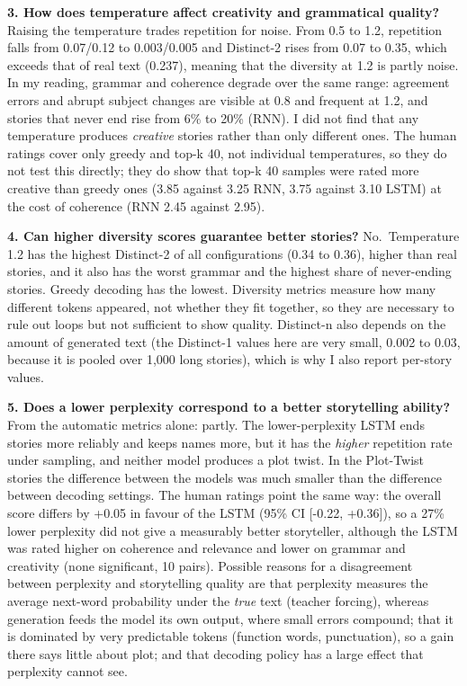 \documentclass[10pt,a4paper]{article}
\begin{document}
\textbf{3. How does temperature affect creativity and grammatical quality?} Raising the temperature trades repetition for noise. From 0.5 to 1.2,
repetition falls from 0.07/0.12 to 0.003/0.005 and Distinct-2 rises from 0.07 to 0.35, which exceeds that of real text (0.237), meaning that the diversity at 1.2
is partly noise. In my reading, grammar and coherence degrade over the same range: agreement errors and abrupt subject changes
are visible at 0.8 and frequent at 1.2, and stories that never end rise from 6\% to 20\% (RNN). I did not find that any temperature produces \emph{creative}
stories rather than only different ones. The human ratings cover only greedy and top-k 40, not individual temperatures, so they do not test this directly; they do show that top-k 40 samples were rated more creative than greedy ones (3.85 against 3.25 RNN, 3.75 against 3.10 LSTM) at the cost of coherence (RNN 2.45 against 2.95).

\textbf{4. Can higher diversity scores guarantee better stories?} No.~Temperature 1.2 has the highest Distinct-2 of all configurations (0.34 to 0.36), higher than
real stories, and it also has the worst grammar and the highest share of never-ending stories. Greedy decoding has the lowest. Diversity metrics measure
how many different tokens appeared, not whether they fit together, so they are necessary to rule out loops but not sufficient to show quality. Distinct-n also depends on
the amount of generated text (the Distinct-1 values here are very small, 0.002 to 0.03, because it is pooled over 1,000 long stories), which is why I also report per-story values.

\textbf{5. Does a lower perplexity correspond to a better storytelling ability?} From the automatic metrics alone: partly. The lower-perplexity LSTM ends
stories more reliably and keeps names more, but it has the \emph{higher} repetition rate under sampling, and neither model produces
a plot twist. In the Plot-Twist stories the difference between the models was much smaller than the difference between decoding settings. The human ratings point the same way: the overall score differs by +0.05 in favour of the LSTM (95\% CI {[}-0.22, +0.36{]}), so a 27\% lower perplexity did not give a measurably better storyteller, although the LSTM was rated higher on coherence and relevance and lower on grammar and creativity (none significant, 10 pairs).
Possible reasons for a disagreement between perplexity and storytelling quality are that perplexity measures the average next-word probability under the \emph{true}
text (teacher forcing), whereas generation feeds the model its own output, where small errors compound; that it is dominated by very predictable tokens (function words, punctuation), so a gain there says little about
plot; and that decoding policy has a large effect that perplexity cannot see.
\end{document}
